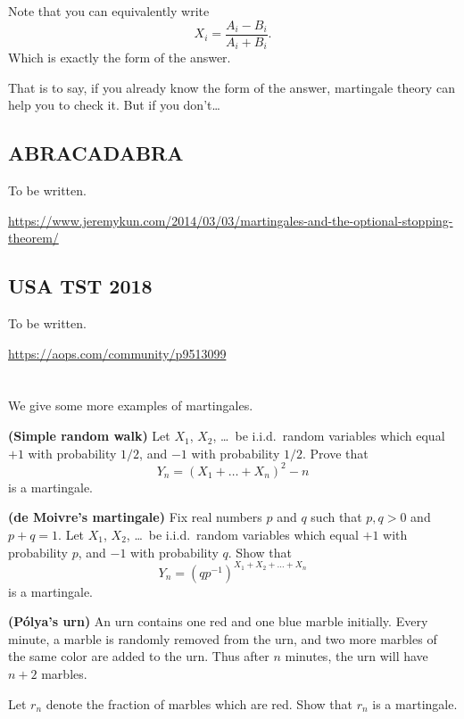 \begin{remark}
	Note that you can equivalently write
	\[ X_i = \frac{A_i-B_i}{A_i+B_i}. \]
	Which is exactly the form of the answer.

	That is to say, if you already know the form of the answer, martingale theory can help you to
	check it. But if you don't\dots
\end{remark}

\subsection{ABRACADABRA}
To be written.

\url{https://www.jeremykun.com/2014/03/03/martingales-and-the-optional-stopping-theorem/}


\subsection{USA TST 2018}
To be written.

\url{https://aops.com/community/p9513099}

\section{\problemhead}

\begin{problem}
	\label{exer:martingale}
	We give some more examples of martingales.
	\begin{enumerate}[(a)]
		\ii \textbf{(Simple random walk)}
		Let $X_1$, $X_2$, \dots\ be i.i.d.\ random variables
		which equal $+1$ with probability $1/2$,
		and $-1$ with probability $1/2$.
		Prove that
		\[ Y_n = \left( X_1 + \dots + X_n \right)^2 - n \]
		is a martingale.

		\ii \textbf{(de Moivre's martingale)}
		Fix real numbers $p$ and $q$ such that $p,q > 0$ and $p+q=1$.
		Let $X_1$, $X_2$, \dots\ be i.i.d.\ random variables
		which equal $+1$ with probability $p$,
		and $-1$ with probability $q$.
		Show that
		\[ Y_n = \left(qp^{-1}\right)^{X_1 + X_2 + \dots + X_n} \]
		is a martingale.

		\ii \textbf{(P\'{o}lya's urn)}
		An urn contains one red and one blue marble initially.
		Every minute, a marble is randomly removed from the urn,
		and two more marbles of the same color are added to the urn.
		Thus after $n$ minutes, the urn will have $n+2$ marbles.

		Let $r_n$ denote the fraction of marbles which are red.
		Show that $r_n$ is a martingale.
	\end{enumerate}
\end{problem}

